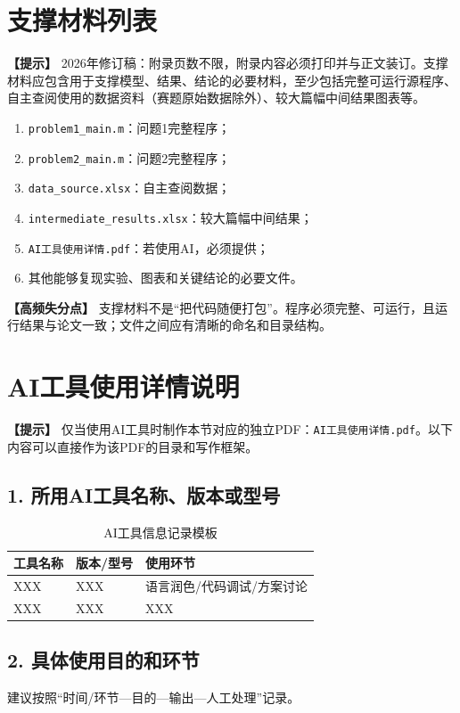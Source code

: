 \documentclass[12pt,a4paper]{article}
\newcommand{\tip}[1]{\par\noindent\textbf{【提示】} #1\par}
\newcommand{\warning}[1]{\par\noindent\textbf{【高频失分点】} #1\par}
\begin{document}
\section{支撑材料列表}

\tip{2026年修订稿：附录页数不限，附录内容必须打印并与正文装订。支撑材料应包含用于支撑模型、结果、结论的必要材料，至少包括完整可运行源程序、自主查阅使用的数据资料（赛题原始数据除外）、较大篇幅中间结果图表等。}

\begin{enumerate}
  \item \texttt{problem1\_main.m}：问题1完整程序；
  \item \texttt{problem2\_main.m}：问题2完整程序；
  \item \texttt{data\_source.xlsx}：自主查阅数据；
  \item \texttt{intermediate\_results.xlsx}：较大篇幅中间结果；
  \item \texttt{AI工具使用详情.pdf}：若使用AI，必须提供；
  \item 其他能够复现实验、图表和关键结论的必要文件。
\end{enumerate}

\warning{支撑材料不是“把代码随便打包”。程序必须完整、可运行，且运行结果与论文一致；文件之间应有清晰的命名和目录结构。}

\section{AI工具使用详情说明}

\tip{仅当使用AI工具时制作本节对应的独立PDF：\texttt{AI工具使用详情.pdf}。以下内容可以直接作为该PDF的目录和写作框架。}

\subsection*{1. 所用AI工具名称、版本或型号}
\begin{table}[H]
\centering
\caption{AI工具信息记录模板}
\begin{tabular}{p{2cm}p{2cm}p{7cm}}
\toprule
工具名称 & 版本/型号 & 使用环节 \\
\midrule
XXX & XXX & 语言润色/代码调试/方案讨论 \\
XXX & XXX & XXX \\
\bottomrule
\end{tabular}
\end{table}

\subsection*{2. 具体使用目的和环节}
建议按照“时间/环节—目的—输出—人工处理”记录。
\end{document}
